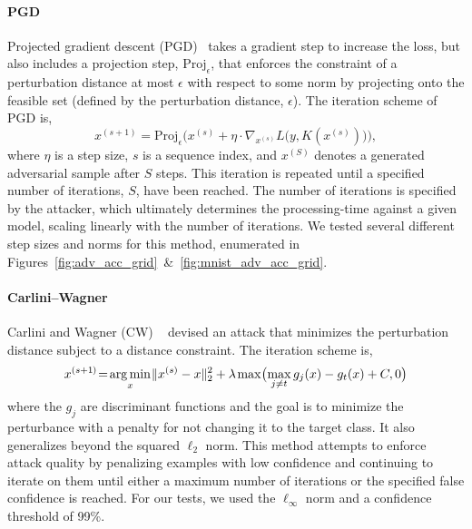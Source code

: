 \documentclass[lettersize,journal]{IEEEtran}
\DeclareMathOperator*{\argmin}{arg\,min}
\begin{document}
\paragraph{PGD}

Projected gradient descent (PGD)~\cite{carlini_towards_2017} takes a gradient step to increase the loss, but also includes a projection step, $\mathrm{Proj}_\epsilon$, that enforces the constraint of a perturbation distance at most $\epsilon$ with respect to some norm
by projecting onto the feasible set (defined by the perturbation distance, $\epsilon$). The iteration scheme of PGD is,
$$
    x^{(s+1)} = \mathrm{Proj}_\epsilon \Big( x^{(s)} + \eta \cdot \nabla_{x^{(s)}} L\big(y, K(x^{(s)})\big) \Big),
$$
where $\eta$ is a step size, $s$ is a sequence index, and $x^{(S)}$ denotes a generated adversarial sample after $S$ steps. This iteration is repeated until a specified number of iterations, $S$, have been reached. The number of iterations is specified by the attacker, which ultimately determines the processing-time against a given model, scaling linearly with the number of iterations. We tested several different step sizes and norms for this method, enumerated in Figures~\ref{fig:adv_acc_grid}~\&~\ref{fig:mnist_adv_acc_grid}. 

\paragraph{Carlini--Wagner}

Carlini and Wagner (CW) ~\cite{carlini_towards_2017} devised an attack that minimizes the perturbation distance subject to a distance constraint.
The iteration scheme is,
$$
    x^{(s+1\hspace{-0.025em})}\hspace{-0.2em}=\hspace{-0.15em}\argmin_x \hspace{-0.1em} \|x^{(s)} - x\|_2^2 + \lambda \hspace{-0.05em} \max\hspace{-0.15em}\big(\hspace{-0.15em}\max_{j\neq t} g_j(x) - g_t(x) + C, 0\big)
$$
where the $g_j$ are discriminant functions and the goal is to minimize the perturbance with a penalty for not changing it to the target class. It also generalizes beyond the squared $\ell_2$ norm. This method attempts to enforce attack quality by penalizing examples with low confidence and continuing to iterate on them until either a maximum number of iterations or the specified false confidence is reached. For our tests, we used the $\ell_{\infty}$ norm and a confidence threshold of 99\%. 
\end{document}
